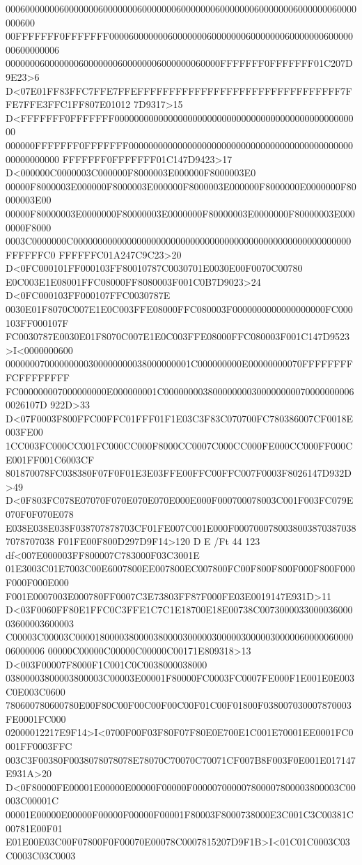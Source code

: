 000600000006000000060000000600000006000000060000000600000006000000060000000600
00FFFFFFF0FFFFFFF0000600000006000000060000000600000006000000060000000600000006
00000006000000060000000600000006000000060000FFFFFFF0FFFFFFF01C207D9E23>6
D<07E01FF83FFC7FFE7FFEFFFFFFFFFFFFFFFFFFFFFFFFFFFFFFFF7FFE7FFE3FFC1FF807E01012
7D9317>15 D<FFFFFFF0FFFFFFF000000000000000000000000000000000000000000000000000
000000FFFFFFF0FFFFFFF000000000000000000000000000000000000000000000000000000000
FFFFFFF0FFFFFFF01C147D9423>17 D<000000C0000003C000000F8000003E000000F8000003E0
00000F8000003E000000F8000003E000000F8000003E000000F8000000E0000000F80000003E00
00000F80000003E0000000F80000003E0000000F80000003E0000000F80000003E0000000F8000
0003C0000000C000000000000000000000000000000000000000000000000000000000FFFFFFC0
FFFFFFC01A247C9C23>20 D<0FC000101FF000103FF80010787C0030701E0030E00F0070C00780
E0C003E1E08001FFC08000FF8080003F001C0B7D9023>24 D<0FC000103FF000107FFC0030787E
0030E01F8070C007E1E0C003FFE08000FFC080003F0000000000000000000FC000103FF000107F
FC0030787E0030E01F8070C007E1E0C003FFE08000FFC080003F001C147D9523>I<0000000600
00000007000000000300000000038000000001C000000000E00000000070FFFFFFFFFCFFFFFFFF
FC000000007000000000E000000001C0000000038000000003000000000700000000060026107D
922D>33 D<07F0003F800FFC00FFC01FFF01F1E03C3F83C070700FC780386007CF0018E003FE00
1CC003FC000CC001FC000CC000F8000CC0007C000CC000FE000CC000FF000CE001FF001C6003CF
801870078FC038380F07F0F01E3E03FFE00FFC00FFC007F0003F8026147D932D>49
D<0F803FC078E07070F070E070E070E000E000F000700078003C001F003FC079E070F0F070E078
E038E038E038F038707878703CF01FE007C001E000F00070007800380038703870387078707038
F01FE00F800D297D9F14>120 D E /Ft 44 123 df<007E000003FF800007C783000F03C3001E
01E3003C01E7003C00E6007800EE007800EC007800FC00F800F800F000F800F000F000F000E000
F001E0007003E000780FF0007C3E73803FF87F000FE03E0019147E931D>11
D<03F0060FF80E1FFC0C3FFE1C7C1E18700E18E00738C007300003300003600003600003600003
C00003C00003C00001800003800003800003000003000003000003000006000006000006000006
00000C00000C00000C00000C00171E809318>13 D<003F00007F8000F1C001C0C0038000038000
03800003800003800003C00003E00001F80000FC0003FC0007FE000F1E001E0E003C0E003C0600
780600780600780E00F80C00F00C00F00C00F01C00F01800F038007030007870003FE0001FC000
02000012217E9F14>I<0700F00F03F80F07F80E0E700E1C001E70001EE0001FC0001FF0003FFC
003C3F00380F0038078078078E78070C70070C70071CF007B8F003F0E001E017147E931A>20
D<0F80000FE00001E00000E00000F00000F000007000007800007800003800003C00003C00001C
00001E00000E00000F00000F00000F00001F80003F8000738000E3C001C3C00381C00781E00F01
E01E00E03C00F07800F0F00070E00078C0007815207D9F1B>I<01C01C0003C03C0003C03C0003
